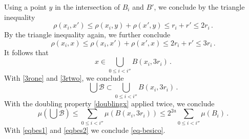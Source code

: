 {Using a point $y$ in the intersection of $B_i$ and $B'$,
we conclude by the triangle inequality
\begin{equation}
   \rho(x_i,x')\le \rho(x_i,y)+\rho(x',y)\le r_i+r'\le 2r_i \, .
\end{equation}
By the triangle inequality again, we further conclude
\begin{equation}
   \rho(x_i,x)\le \rho(x_i,x')+\rho(x',x)\le 2r_i+r'\le 3r_i \, .
\end{equation}
It follows that
\begin{equation}\label{3rtwo}
    x\in  \bigcup _{0\le i< i''}B(x_i,3r_i)\, .
\end{equation}
With \eqref{3rone} and \eqref{3rtwo}, we conclude
\begin{equation}
\bigcup \mathcal{B}\subset
\bigcup _{0\le i< i''}B(x_i,3r_i)\, .
\end{equation}
With the doubling property
\eqref{doublingx} applied twice, we conclude
\begin{equation}\label{eqbes2}
    \mu(\bigcup{\mathcal{B}})
    \le \sum _{0\le i< i''}\mu (B(x_i,3r_i))
    \le 2^{2a}\sum _{0\le i< i''}\mu (B_i)\, .
\end{equation}
With \eqref{eqbes1} and \eqref{eqbes2} we conclude
\eqref{eq-besico}.


}
